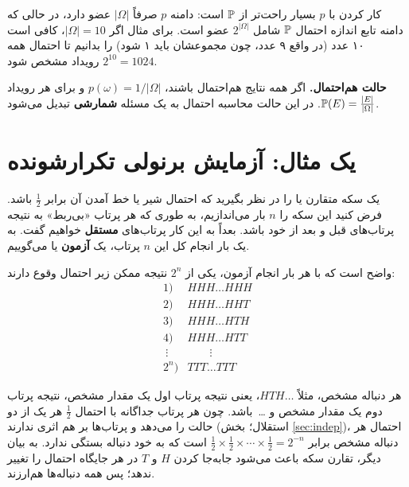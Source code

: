 \begin{note}
\notetitle کار کردن با $p$ بسیار راحت‌تر از $\mathbb{P}$ است: دامنه $p$ صرفاً $|\Omega|$ عضو دارد، در حالی که دامنه تابع اندازه احتمال $\mathbb{P}$ شامل $2^{|\Omega|}$ عضو است. برای مثال اگر $|\Omega|=10$، کافی است ۱۰ عدد (در واقع ۹ عدد، چون مجموعشان باید ۱ شود) را بدانیم تا احتمال همه $2^{10}=1024$ رویداد مشخص شود.
\end{note}

\begin{note}
\notetitle \textbf{حالت هم‌احتمال.} اگر همه نتایج هم‌احتمال باشند، $p(\omega)=1/|\Omega|$ و برای هر رویداد
$\mathbb{P}(E)=\frac{|E|}{|\Omega|}$.
در این حالت محاسبه احتمال به یک مسئله \textbf{شمارشی} تبدیل می‌شود.
\end{note}

\section{یک مثال: آزمایش برنولی تکرارشونده }

یک سکه متقارن یا  را در نظر بگیرید که احتمال شیر  یا خط  آمدن آن برابر $\frac12$ باشد. فرض کنید این سکه را $n$ بار می‌اندازیم، به طوری که هر پرتاب «بی‌ربط» به نتیجه پرتاب‌های قبل و بعد از خود باشد. بعداً به این کار پرتاب‌های \textbf{مستقل} خواهیم گفت. به یک بار انجام کل این $n$ پرتاب، یک \textbf{آزمون} یا  می‌گوییم.

واضح است که با هر بار انجام آزمون، یکی از $2^n$ نتیجه ممکن زیر احتمال وقوع دارند:
\[
\begin{array}{ll}
1) & HHH\ldots HHH\\
2) & HHH\ldots HHT\\
3) & HHH\ldots HTH\\
4) & HHH\ldots HTT\\
\ \vdots & \qquad\vdots\\
2^n) & TTT\ldots TTT
\end{array}
\]

\begin{question}
\begin{answer}
هر دنباله مشخص، مثلاً $HTH\ldots$، یعنی نتیجه پرتاب اول یک مقدار مشخص، نتیجه پرتاب دوم یک مقدار مشخص و \ldots\ باشد. چون هر پرتاب جداگانه با احتمال $\frac12$ هر یک از دو حالت را می‌دهد و پرتاب‌ها بر هم اثری ندارند (استقلال؛ بخش \ref{sec:indep})، احتمال هر دنباله مشخص برابر $\frac12\times\frac12\times\cdots\times\frac12=2^{-n}$ است که به خود دنباله بستگی ندارد. به بیان دیگر، تقارن سکه باعث می‌شود جابه‌جا کردن $H$ و $T$ در هر جایگاه احتمال را تغییر ندهد؛ پس همه دنباله‌ها هم‌ارزند.
\end{answer}
\end{question}

